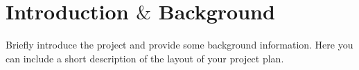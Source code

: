 \chapter{Introduction $\&$ Background } Briefly introduce the project and provide some background information. Here you can include a short description of the layout of your project plan.

